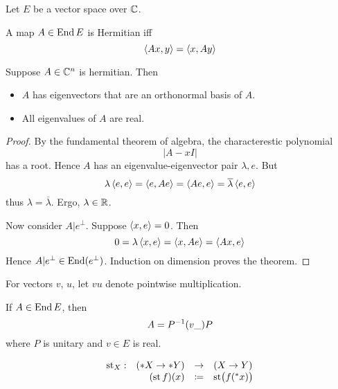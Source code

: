 \documentclass{scrartcl}
\newcommand{\conj}[1]{\overline{#1}}
\newcommand{\hyper}[1]{\prescript{*}{}{#1}}
\renewcommand{\define}{\coloneqq}
\DeclareMathOperator{\st}{st}
\begin{document}
Let $E$ be a vector space over $\mathbb{C}$. 
\begin{defn}[Hermitian]
  A map $A\in \operatorname{End}{E}$ is Hermitian iff
  \[
    \left\langle Ax, y \right\rangle=\left\langle x, Ay \right\rangle
  \]
\end{defn}
\begin{theorem}
  \label{finite-spectral-theorem}
  Suppose $A\in  \mathbb{C}^n$ is hermitian. Then
  \begin{itemize}
  \item $A$ has eigenvectors that are an orthonormal basis of $A$.
  \item All eigenvalues of $A$ are real. 
  \end{itemize}

\end{theorem}
\begin{proof}
  \renewcommand{\vec}{}
  By the fundamental theorem of algebra, the characterestic polynomial
  \[
    |A-xI|
  \]
  has a root. Hence $A$ has an eigenvalue-eigenvector pair $\lambda, \vec e$. But
  \[
    \lambda \inner{\vec e}{\vec e}=\inner{\vec e}{A \vec e}=\inner{A\vec e}{\vec e}=\conj\lambda \inner{\vec e}{\vec e}
  \]
  thus $\lambda = \conj\lambda$. Ergo, $\lambda\in \mathbb{R}$. 

  Now consider $A|e^\perp$. Suppose $\left\langle x, e \right\rangle=0$. Then 
  \[
    0=\lambda\left\langle x, e \right\rangle=\left\langle x, Ae \right\rangle=\left\langle Ax, e \right\rangle
  \]
  Hence $A|e^\perp\in\operatorname{End}(e^\perp)$. Induction on dimension proves the theorem. 
\end{proof}

For vectors $v$, $u$, let $vu$ denote pointwise multiplication. 
\begin{cor}[diagonalization]
  \label{thm:diag}
  If $A\in\operatorname{End} E$, then 
  \[
    A=P^{-1}(v\_)P\\
  \]
  where $P$ is unitary and $v\in E$ is real.
\end{cor}

\begin{defn}
  \[
  \begin{array}{lrll}
   \st_X: &(*X \to *Y) &\to& (X \to Y) \\
    &(\st f)(x) &\define& \st\bigl( f(\hyper x)\bigr)
  \end{array}
  \]
\end{defn}
\end{document}
